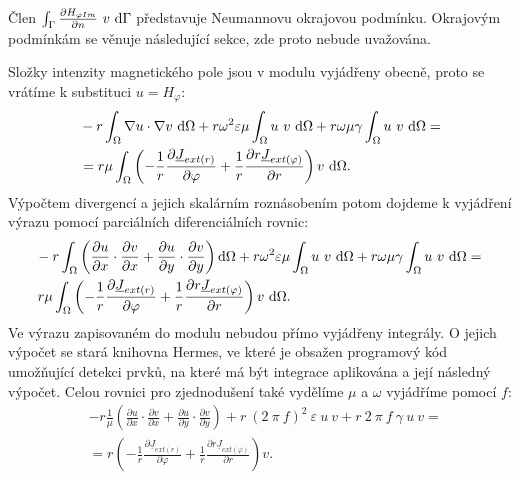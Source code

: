 \documentclass[12pt,a4paper,oneside]{article}
\numberwithin{equation}{section} %
\numberwithin{figure}{section} %
\numberwithin{table}{section} %
\newcommand{\faz}[1]{{\underline{#1}}} %
\begin{document}
Člen $\int _{\Gamma} \frac{\partial H _{\varphi Im}}{\partial n} ~ v ~ \mathrm{d} \Gamma$ představuje Neumannovu okrajovou podmínku. Okrajovým podmínkám se věnuje následující sekce, zde proto nebude uvažována.

Složky intenzity magnetického pole jsou v modulu vyjádřeny obecně, proto se vrátíme k substituci $u = H _{\varphi}$:
\begin{equation}
\begin{split}
&- r \int _{\Omega} \nabla u \cdot \nabla v ~ \ud \Omega + r \omega ^2 \varepsilon \mu \int _{\Omega} u ~ v ~ \ud \Omega + r \omega \mu \gamma \int _{\Omega} u ~ v ~ \ud \Omega = 
\\
&= r \mu \int _{\Omega} \left( - \frac{1}{r} \frac{\partial \faz{J} _{ext(r)}}{\partial \varphi} + \frac{1}{r} \frac{\partial r \faz{J} _{ext(\varphi)}}{\partial r} \right) v ~ \ud \Omega .
\end{split}
\end{equation}
Výpočtem divergencí a jejich skalárním roznásobením potom dojdeme k vyjádření výrazu pomocí parciálních diferenciálních rovnic:
\begin{equation}
\begin{split}
&\!-r \int _{\Omega} \left( \frac{\partial u}{\partial x} \cdot \frac{\partial v}{\partial x} + \frac{\partial u}{\partial y} \cdot \frac{\partial v}{\partial y} \right) \ud \Omega + r \omega ^2 \varepsilon \mu \int _{\Omega} u ~ v ~ \ud \Omega + r \omega \mu \gamma \int _{\Omega} u ~ v ~ \ud \Omega = 
\\
&r \mu \int _{\Omega} \left( - \frac{1}{r} \frac{\partial \faz{J} _{ext(r)}}{\partial \varphi} + \frac{1}{r} \frac{\partial r \faz{J} _{ext(\varphi)}}{\partial r} \right) v ~ \ud \Omega .
\end{split}
\end{equation}
Ve výrazu zapisovaném do modulu nebudou přímo vyjádřeny integrály. O jejich výpočet se stará knihovna Hermes, ve které je obsažen programový kód umožňující detekci prvků, na které má být integrace aplikována a její následný výpočet. Celou rovnici pro zjednodušení také vydělíme $\mu$ a $\omega$ vyjádříme pomocí $f$:
\begin{equation}
\begin{split}
&- r \frac{1}{\mu} \left( \frac{\partial u}{\partial x} \cdot \frac{\partial v}{\partial x} + \frac{\partial u}{\partial y} \cdot \frac{\partial v}{\partial y} \right) + r ~ (2 ~ \pi ~ f) ^2 ~ \varepsilon ~ u ~ v + r ~ 2 ~ \pi ~ f ~ \gamma ~ u ~ v =\\ 
&= r \left( - \frac{1}{r} \frac{\partial \faz{J} _{ext(r)}}{\partial \varphi} + \frac{1}{r} \frac{\partial r \faz{J} _{ext(\varphi)}}{\partial r} \right) v .
\end{split}
\end{equation}
\end{document}
